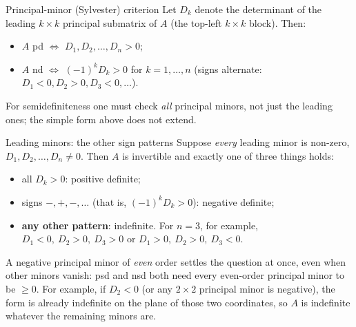 \begin{rulebox}{Principal-minor (Sylvester) criterion}
Let $D_{k}$ denote the determinant of the leading $k \times k$ principal
submatrix of $A$ (the top-left $k \times k$ block). Then:
\begin{itemize}[leftmargin=1.6em,itemsep=0.3ex]
    \item $A$ pd $\Leftrightarrow$ $D_{1}, D_{2}, \dots, D_{n} > 0$;
    \item $A$ nd $\Leftrightarrow$ $(-1)^{k} D_{k} > 0$ for $k = 1, \dots, n$
          (signs alternate: $D_{1} < 0, D_{2} > 0, D_{3} < 0, \dots$).
\end{itemize}
For semidefiniteness one must check \emph{all} principal minors, not just
the leading ones; the simple form above does not extend.
\end{rulebox}

\begin{rulebox}{Leading minors: the other sign patterns}
Suppose \emph{every} leading minor is non-zero, $D_{1}, D_{2}, \dots, D_{n}
\neq 0$. Then $A$ is invertible and exactly one of three things holds:
\begin{itemize}[leftmargin=1.6em,itemsep=0.3ex]
    \item all $D_{k} > 0$: positive definite;
    \item signs $-, +, -, \dots$ (that is, $(-1)^{k} D_{k} > 0$): negative definite;
    \item \textbf{any other pattern}: indefinite. For $n = 3$, for example,
          $D_{1} < 0,\ D_{2} > 0,\ D_{3} > 0$ or $D_{1} > 0,\ D_{2} > 0,\ D_{3} < 0$.
\end{itemize}
A negative principal minor of \emph{even} order settles the question at
once, even when other minors vanish: psd and nsd both need every
even-order principal minor to be $\ge 0$. For example, if $D_{2} < 0$ (or
any $2 \times 2$ principal minor is negative), the form is already
indefinite on the plane of those two coordinates, so $A$ is indefinite
whatever the remaining minors are.
\end{rulebox}

